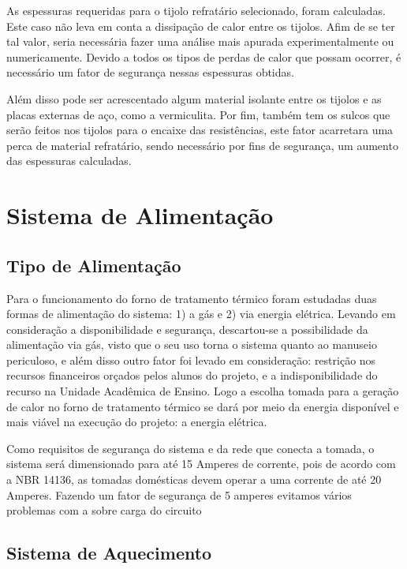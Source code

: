 As espessuras requeridas para o tijolo refratário selecionado, foram calculadas. Este caso não leva em conta a dissipação de calor entre os tijolos. Afim de se ter tal valor, seria necessária fazer uma análise mais apurada experimentalmente ou numericamente.
Devido a todos os tipos de perdas de calor que possam ocorrer, é necessário um fator de segurança nessas espessuras obtidas. 

Além disso pode ser acrescentado algum material isolante entre os tijolos e as placas externas de aço, como a vermiculita.
Por fim, também tem os sulcos que serão feitos nos tijolos para o encaixe das resistências, este fator acarretara uma perca de material refratário, sendo necessário por fins de segurança, um aumento das espessuras calculadas.

\section{Sistema de Alimentação}

\subsection{Tipo de Alimentação}

Para o funcionamento do forno de tratamento térmico foram estudadas duas formas de alimentação do sistema: 1) a gás e 2) via energia elétrica. Levando em consideração a disponibilidade e segurança, descartou-se a possibilidade da alimentação via gás, visto que o seu uso torna o sistema quanto ao manuseio periculoso, e além disso outro fator foi levado em consideração: restrição nos recursos financeiros orçados pelos alunos do projeto, e a indisponibilidade do recurso na Unidade Acadêmica de Ensino. Logo a escolha tomada para a geração de calor no forno de tratamento térmico se dará por meio da energia disponível e mais viável na execução do projeto: a energia elétrica. 

Como requisitos de segurança do sistema e da rede que conecta a tomada, o sistema será dimensionado para até 15 Amperes de corrente, pois de acordo com a NBR 14136, as tomadas domésticas devem operar a uma corrente de até 20 Amperes. Fazendo um fator de segurança de 5 amperes evitamos vários problemas com a sobre carga do circuito

\subsection{Sistema de Aquecimento}

